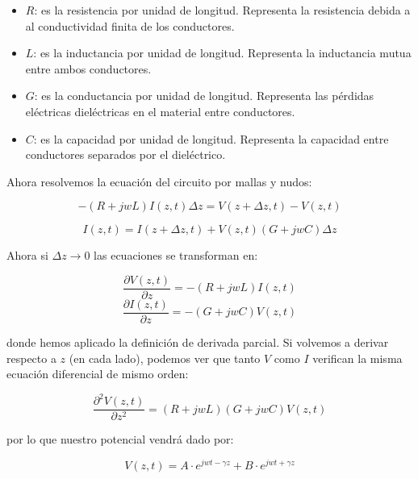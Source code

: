 \documentclass[12pt,a4paper]{article}
\newcommand{\parciales}[2]{\frac{\partial #1}{\partial #2}}
\begin{document}
\begin{itemize}
\item $R$: es la resistencia por unidad de longitud. Representa la resistencia debida a al conductividad finita de los conductores.

\item $L$: es la inductancia por unidad de longitud. Representa la inductancia mutua entre ambos conductores. 

\item $G$: es la conductancia por unidad de longitud. Representa las pérdidas eléctricas dieléctricas en el material entre conductores.

\item $C$: es la capacidad por unidad de longitud. Representa la capacidad entre conductores separados por el dieléctrico.
\end{itemize}
 
Ahora resolvemos la ecuación del circuito por mallas y nudos:

\begin{equation}
-(R+jwL)I(z,t)\Delta z = V(z+\Delta z,t) - V(z,t)  \label{Ec:8.1-001}
\end{equation}

\begin{equation}
I(z,t)= I(z+\Delta z,t) + V(z,t)(G+jwC) \Delta z \label{Ec:8.1-002}
\end{equation}

Ahora si $\Delta z \rightarrow 0$ las ecuaciones se transforman en:

\begin{equation}
\parciales{V(z,t)}{z} = - (R+jwL)I(z,t)
\end{equation}
\begin{equation}
\parciales{I(z,t)}{z} = - (G+jwC)V(z,t)
\end{equation}
 
donde hemos aplicado la definición de derivada parcial. Si volvemos a derivar respecto a $z$ (en cada lado), podemos ver que tanto $V$ como $I$ verifican la misma ecuación diferencial de mismo orden:

\begin{equation}
\parciales{^2 V(z,t)}{z^2} = (R+jwL)(G+jwC)V(z,t)
\end{equation}
 
por lo que nuestro potencial vendrá dado por:

\begin{equation}
V(z,t) = A \cdot e^{jwt-\gamma z} + B \cdot e^{jwt + \gamma z}
\end{equation}
\end{document}

